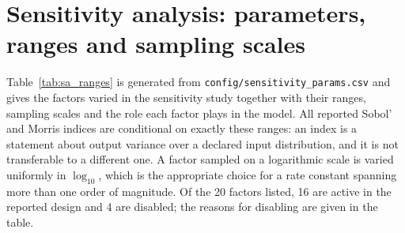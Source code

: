 \section{Sensitivity analysis: parameters, ranges and sampling scales}
\label{app:sa}

Table~\ref{tab:sa_ranges} is generated from
\texttt{config/sensitivity\_params.csv} and gives the factors varied in the
sensitivity study together with their ranges, sampling scales and the role each
factor plays in the model. All reported Sobol' and Morris indices are conditional
on exactly these ranges: an index is a statement about output variance over a
declared input distribution, and it is not transferable to a different one. A
factor sampled on a logarithmic scale is varied uniformly in $\log_{10}$, which
is the appropriate choice for a rate constant spanning more than one order of
magnitude. Of the 20 factors listed, 16 are active in the reported design and 4
are disabled; the reasons for disabling are given in the table.

